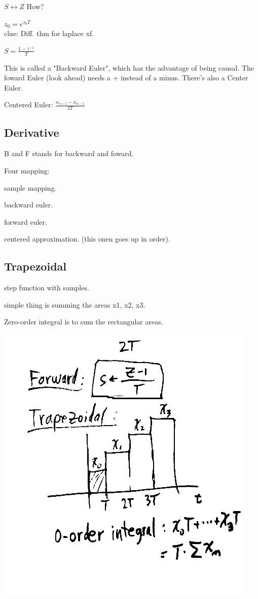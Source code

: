 $S \leftrightarrow Z$ How?

$z_0 = e^{s_0 T}$ \\

clue: Diff. thm for laplace xf.


$S = \frac{1 - z^{-1}}{T}$

This is called a "Backward Euler", which has the advantage of being causal. The foward Euler (look ahead) needs a + instead of a minus. There's also a Center Euler.

Centered Euler: $\frac{x_{n + 1} - x_{n - 1}}{2T}$

\subsection*{Derivative}




B and F stands for backward and foward.


Four mapping:

sample mapping.

backward euler.

forward euler.

centered approximation. (this onen goes up in order).

\subsection*{Trapezoidal}

step function with samples.  

simple thing is summing the areas x1, x2, x3.

Zero-order integral is to sum the rectangular areas.

\includegraphics[scale=0.5]{photos/jan17/9b}

